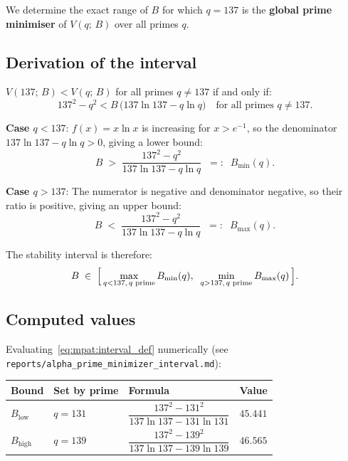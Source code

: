 \documentclass[12pt,a4paper]{article}
\theoremstyle{definition}
\theoremstyle{remark}
\begin{document}
We determine the exact range of $B$ for which $q = 137$ is the
\textbf{global prime minimiser} of $V(q;\,B)$ over all primes $q$.

\subsection{Derivation of the interval}

$V(137;\,B) < V(q;\,B)$ for all primes $q \neq 137$ if and only if:
\begin{equation}
  137^2 - q^2 < B\,\bigl(137\ln 137 - q\ln q\bigr)
  \quad\text{for all primes }q \neq 137.
  \label{eq:mpat:ineq}
\end{equation}

\noindent\textbf{Case $q < 137$}: $f(x) = x\ln x$ is increasing for $x > e^{-1}$,
so the denominator $137\ln 137 - q\ln q > 0$, giving a lower bound:
\[
  B \;>\; \frac{137^2 - q^2}{137\ln 137 - q\ln q}
  \;\;=:\;\; B_{\min}(q).
\]

\noindent\textbf{Case $q > 137$}: The numerator is negative and denominator
negative, so their ratio is positive, giving an upper bound:
\[
  B \;<\; \frac{137^2 - q^2}{137\ln 137 - q\ln q}
  \;\;=:\;\; B_{\max}(q).
\]

The stability interval is therefore:
\begin{equation}
  B \;\in\;
  \Bigl[\,
    \max_{q<137,\,q\text{ prime}} B_{\min}(q),\;\;
    \min_{q>137,\,q\text{ prime}} B_{\max}(q)
  \,\Bigr].
  \label{eq:mpat:interval_def}
\end{equation}

\subsection{Computed values}

Evaluating~\eqref{eq:mpat:interval_def} numerically (see
\texttt{reports/alpha\_prime\_minimizer\_interval.md}):

\begin{center}
\renewcommand{\arraystretch}{1.3}
\begin{tabular}{llll}
\toprule
\textbf{Bound} & \textbf{Set by prime} & \textbf{Formula} & \textbf{Value} \\
\midrule
$B_{\mathrm{low}}$ & $q = 131$ &
  $\dfrac{137^2 - 131^2}{137\ln 137 - 131\ln 131}$ & $45.441$ \\[8pt]
$B_{\mathrm{high}}$ & $q = 139$ &
  $\dfrac{137^2 - 139^2}{137\ln 137 - 139\ln 139}$ & $46.565$ \\
\bottomrule
\end{tabular}
\end{center}
\end{document}
